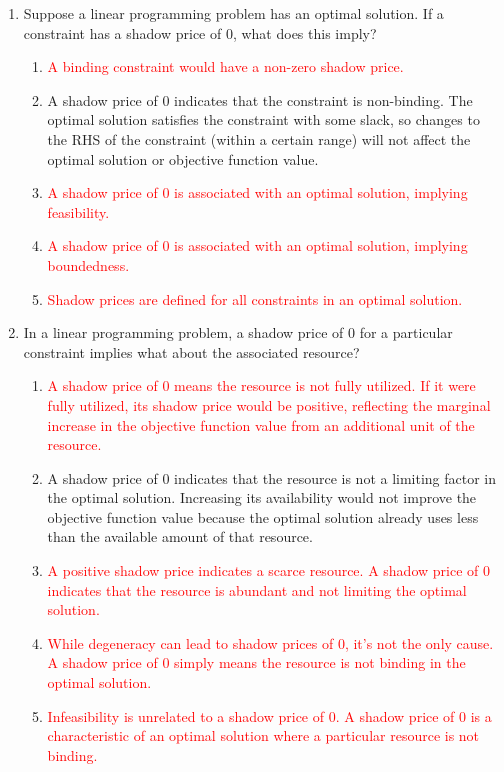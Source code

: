 \documentclass{article}%
\newcommand{\incorrect}[1]{\textcolor{red}{#1}}
\begin{document}
\begin{enumerate}
\begin{enumerate}
\end{enumerate}%
\vspace{1em}%
\item Suppose a linear programming problem has an optimal solution.  If a constraint has a shadow price of 0, what does this imply?%
\begin{enumerate}%
\item \incorrect{A binding constraint would have a non-zero shadow price.}%
\item A shadow price of 0 indicates that the constraint is non-binding.  The optimal solution satisfies the constraint with some slack, so changes to the RHS of the constraint (within a certain range) will not affect the optimal solution or objective function value.%
\item \incorrect{A shadow price of 0 is associated with an optimal solution, implying feasibility.}%
\item \incorrect{A shadow price of 0 is associated with an optimal solution, implying boundedness.}%
\item \incorrect{Shadow prices are defined for all constraints in an optimal solution.}%
\end{enumerate}%
\vspace{1em}%
\item In a linear programming problem, a shadow price of 0 for a particular constraint implies what about the associated resource?%
\begin{enumerate}%
\item \incorrect{A shadow price of 0 means the resource is not fully utilized. If it were fully utilized, its shadow price would be positive, reflecting the marginal increase in the objective function value from an additional unit of the resource.}%
\item A shadow price of 0 indicates that the resource is not a limiting factor in the optimal solution.  Increasing its availability would not improve the objective function value because the optimal solution already uses less than the available amount of that resource.%
\item \incorrect{A positive shadow price indicates a scarce resource. A shadow price of 0 indicates that the resource is abundant and not limiting the optimal solution.}%
\item \incorrect{While degeneracy can lead to shadow prices of 0, it's not the only cause. A shadow price of 0 simply means the resource is not binding in the optimal solution.}%
\item \incorrect{Infeasibility is unrelated to a shadow price of 0.  A shadow price of 0 is a characteristic of an optimal solution where a particular resource is not binding.}%
\end{enumerate}%
\vspace{1em}%
\end{enumerate}

%
\end{document}
